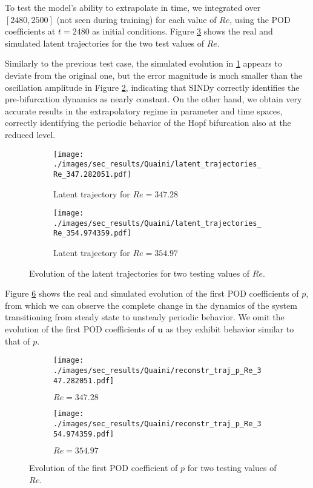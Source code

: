 \documentclass[reqno]{amsart}[standalone]
\theoremstyle{definition}
\theoremstyle{remark}
\newcommand{\bs}{\boldsymbol}
\begin{document}
To test the model's ability to extrapolate in time, we integrated over $[2480, 2500]$ (not seen during training) for each value of $Re$, using the POD coefficients at $t=2480$ as initial conditions.
Figure \ref{figQUAINI_LATENT_P} shows the real and simulated latent trajectories for the two test values of $Re$.

Similarly to the previous test case, the simulated evolution in \ref{latentRE_PREBIF} appears to deviate from the original one, but the error magnitude is much smaller than the oscillation amplitude in Figure \ref{latentRE_BIF}, indicating that SINDy correctly identifies the pre-bifurcation dynamics as nearly constant. On the other hand, we obtain very accurate results in the extrapolatory regime in parameter and time spaces, correctly identifying the periodic behavior of the Hopf bifurcation also at the reduced level.

\begin{figure}[htbp]
\centering
\begin{subfigure}{0.9\linewidth}
\centering
\texttt{[image: ./images/sec\_results/Quaini/latent\_trajectories\_Re\_347.282051.pdf]}
\caption{Latent trajectory for $Re=347.28$}
\label{latentRE_PREBIF}
\end{subfigure}

\vspace{0.5cm}

\begin{subfigure}{0.9\linewidth}
\centering
\texttt{[image: ./images/sec\_results/Quaini/latent\_trajectories\_Re\_354.974359.pdf]}
\caption{Latent trajectory for $Re=354.97$}
\label{latentRE_BIF}
\end{subfigure}
\caption{Evolution of the latent trajectories for two testing values of $Re$.}
%
\label{figQUAINI_LATENT_P}
\end{figure}

Figure \ref{figQUAINI_P_TRAJ} shows the real and simulated evolution of the first POD coefficients of $p$, from which we can observe the complete change in the dynamics of the system transitioning from steady state to unsteady periodic behavior.
We omit the evolution of the first POD coefficients of $\bs{u}$ as they exhibit behavior similar to that of $p$.

%


\begin{figure}[htbp]
\begin{subfigure}{0.49\linewidth}
\centering
\texttt{[image: ./images/sec\_results/Quaini/reconstr\_traj\_p\_Re\_347.282051.pdf]}
\caption{$Re=347.28$}
\label{figPARAM_P_RECONSTR_PREBIF}
\end{subfigure}
\hfill
\begin{subfigure}{0.49\linewidth}
\centering
\texttt{[image: ./images/sec\_results/Quaini/reconstr\_traj\_p\_Re\_354.974359.pdf]}
\caption{$Re=354.97$}
\label{figPARAM_P_RECONSTR_BIF}
\end{subfigure}
\caption{Evolution of the first POD coefficient of $p$ for two testing values of $Re$.}
\label{figQUAINI_P_TRAJ}
\end{figure}
\end{document}
